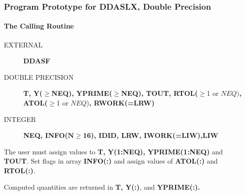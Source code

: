 \documentclass[twoside]{MATH77}
\begin{document}
\subsubsection{Program Prototype for DDASLX, Double Precision\label{PPSP}}
\paragraph{The Calling Routine\label{Calling}}
\begin{description}
\item [EXTERNAL]\raggedright
  \textbf{DDASF}
\item[DOUBLE PRECISION] \quad\raggedright
  \textbf{T, Y(}$\mathbf{\geq}$\textbf{NEQ), YPRIME(}$\mathbf{\geq}%
  $\textbf{NEQ), TOUT, RTOL(}$\geq$1 or $NEQ)$\textbf{, ATOL(}$\geq$1 or
  $NEQ$)\textbf{, RWORK(=LRW)}
\item[INTEGER]\quad\raggedright
  \textbf{NEQ, INFO(}$\mathbf{N \geq}$\textbf{16), IDID, LRW, IWORK(=LIW),LIW}
\end{description}
The user must assign values to \textbf{T, Y(1:NEQ), YPRIME(1:NEQ)} and
\textbf{TOUT}.  Set flags in array \textbf{INFO(:)} and assign values of
\textbf{ATOL(:)} and \textbf{RTOL(:)}.


Computed quantities are returned in \textbf{T, Y(:)}, and \textbf{YPRIME(:).}
\end{document}
